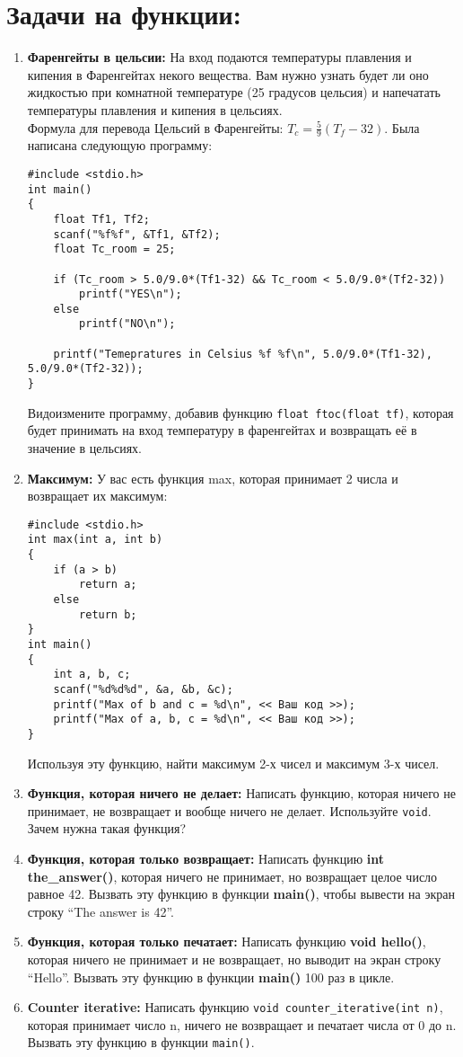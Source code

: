 \documentclass{article}
\begin{document}
\section*{Задачи на функции:}
\begin{enumerate}
\item \textbf{Фаренгейты в цельсии:} На вход подаются температуры плавления и кипения в Фаренгейтах некого вещества. Вам нужно узнать будет ли оно жидкостью при комнатной температуре (25 градусов цельсия) и напечатать температуры плавления и кипения в цельсиях.\\ Формула для перевода Цельсий в Фаренгейты: $T_c = \frac{5}{9}(T_f-32)$. Была написана следующую программу:
\begin{lstlisting}
#include <stdio.h>
int main()
{
	float Tf1, Tf2;
	scanf("%f%f", &Tf1, &Tf2);
	float Tc_room = 25;
	
	if (Tc_room > 5.0/9.0*(Tf1-32) && Tc_room < 5.0/9.0*(Tf2-32))
		printf("YES\n");
	else
		printf("NO\n");
	
	printf("Temepratures in Celsius %f %f\n", 5.0/9.0*(Tf1-32), 5.0/9.0*(Tf2-32));
}
\end{lstlisting}
Видоизмените программу, добавив функцию \texttt{float ftoc(float tf)}, которая будет принимать на вход температуру в фаренгейтах и возвращать её в значение в цельсиях.

\item \textbf{Максимум:} У вас есть функция max, которая принимает 2 числа и возвращает их максимум:
\begin{lstlisting}
#include <stdio.h>
int max(int a, int b)
{
	if (a > b)
		return a;
	else
		return b;
}
int main()
{
	int a, b, c;
	scanf("%d%d%d", &a, &b, &c);
	printf("Max of b and c = %d\n", << Ваш код >>);
	printf("Max of a, b, c = %d\n", << Ваш код >>);
}

\end{lstlisting}
Используя эту функцию, найти максимум 2-х чисел и максимум 3-х чисел.
\item \textbf{Функция, которая ничего не делает:} Написать функцию, которая ничего не принимает, не возвращает и вообще ничего не делает. Используйте \texttt{void}. Зачем нужна такая функция?
\item \textbf{Функция, которая только возвращает:} Написать функцию \textbf{int the\_answer()}, которая ничего не принимает, но возвращает целое число равное 42. Вызвать эту функцию в функции \textbf{main()}, чтобы вывести на экран строку ``The answer is 42''.
\item \textbf{Функция, которая только печатает:} Написать функцию \textbf{void hello()}, которая ничего не принимает и не возвращает, но выводит на экран строку ``Hello''. Вызвать эту функцию в функции \textbf{main()} 100 раз в цикле.
\item \textbf{Counter iterative:} Написать функцию \texttt{void counter\_iterative(int n)}, которая принимает число n, ничего не возвращает и печатает числа от 0 до n. Вызвать эту функцию в функции \texttt{main()}.


\end{enumerate}
\end{document}
